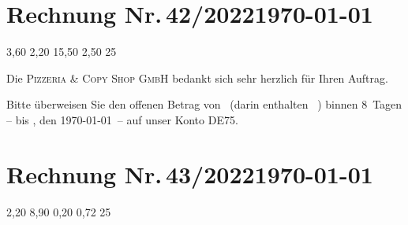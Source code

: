 \documentclass[12pt]{scrartcl}		%
\begin{document}
\section*{Rechnung Nr.\,42/2022\hfill\today}	%
	\begin{invoice*}[B]				%
		\UseEuro					%
		\NumbersOn					%
		\SeparatorOff				%
				{3,60}
			{2,20}
									{15,50}
							{2,50}
						{25}
	\end{invoice*}
\def\payperiod{8}					%

Die \textsc{Pizzeria \& Copy Shop GmbH} bedankt sich sehr herzlich für Ihren Auftrag. 

Bitte überweisen Sie den offenen Betrag von 
\Total\ (darin enthalten \TaxAmnt ~\TaxAbrv) 
binnen \payperiod~Tagen – bis \DayName{\year}{\month}{\day+\payperiod}, 
den \AdvanceDate[\payperiod]\today\ – 
auf unser Konto DE75.

\AdvanceDate[-\payperiod]		%

\section*{Rechnung Nr.\,43/2022\hfill\today}
	\begin{invoice}[N]				%
		\NumbersOff					%
		\SeparatorOff				%
			{2,20}
									{8,90}
								{0,20}
							{0,72}
						{25}
	\end{invoice}
\end{document}
